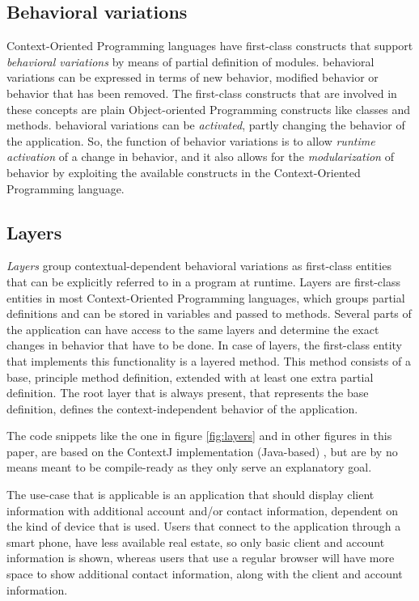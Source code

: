\documentclass{acm_proc_article-sp}
\begin{document}
\subsection{Behavioral variations}
\label{sec:behavioral_variations}
Context-Oriented Programming languages have first-class constructs that support \textit{behavioral variations} by means of partial definition of modules. behavioral variations can be expressed in terms of new behavior, modified behavior or behavior that has been removed. The first-class constructs that are involved in these concepts are plain Object-oriented Programming constructs like classes and methods. behavioral variations can be \textit{activated}, partly changing the behavior of the application. So, the function of behavior variations is to allow \textit{runtime activation} of a change in behavior, and it also allows for the \textit{modularization} of behavior by exploiting the available constructs in the Context-Oriented Programming language.    

\subsection{Layers}
\label{sec:layers}
\textit{Layers} group contextual-dependent behavioral variations as first-class entities that can be explicitly referred to in a program at runtime. Layers are first-class entities in most Context-Oriented Programming languages, which groups partial definitions and can be stored in variables and passed to methods. Several parts of the application can have access to the same layers and determine the exact changes in behavior that have to be done. In case of layers, the first-class entity that implements this functionality is a layered method. This method consists of a base, principle method definition, extended with at least one extra partial definition. The root layer that is always present, that represents the base definition, defines the context-independent behavior of the application.

The code snippets like the one in figure \ref{fig:layers} and in other figures in this paper, are based on the ContextJ implementation (Java-based) \cite{Appeltauer:2009:IDC:1562112.1562117}, but are by no means meant to be compile-ready as they only serve an explanatory goal. 

The use-case that is applicable is an application that should display client information with additional account and/or contact information, dependent on the kind of device that is used. Users that connect to the application through a smart phone, have less available real estate, so only basic client and account information is shown, whereas users that use a regular browser will have more space to show additional contact information, along with the client and account information. 
\newpage
\end{document}
